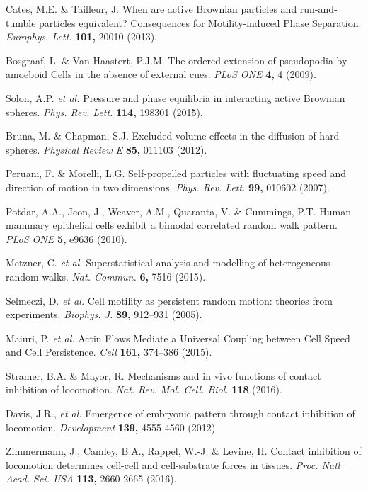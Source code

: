 \documentclass[11pt, twocolumn]{article}
\begin{document}
\begin{thebibliography}{10}
Cates, M.E. \& Tailleur, J. When are active Brownian particles and run-and-tumble particles equivalent? Consequences for Motility-induced Phase Separation. \emph{Europhys. Lett.} \textbf{101,} 20010 (2013).

Bosgraaf, L. \& Van Haastert, P.J.M. The ordered extension of pseudopodia by amoeboid Cells in the absence of external cues.
 {\em PLoS ONE} \textbf{4,} 4 (2009).

Solon, A.P. \textit{et al.} Pressure and phase equilibria in interacting active Brownian spheres.
 \emph{Phys. Rev. Lett.} \textbf{114,} 198301 (2015).

Bruna, M. \& Chapman, S.J. Excluded-volume effects in the diffusion of hard spheres.
 {\em Physical Review E} \textbf{85,} 011103 (2012).

Peruani, F. \& Morelli, L.G. Self-propelled particles with fluctuating speed and direction of motion in two dimensions.
 {\em Phys. Rev. Lett.} \textbf{99,} 010602 (2007).

 Potdar, A.A., Jeon, J., Weaver, A.M., Quaranta, V. \& Cummings, P.T. Human mammary epithelial cells exhibit a bimodal correlated random walk pattern.
 {\em PLoS ONE} \textbf{5,} e9636 (2010).

 Metzner, C. \textit{et al.} Superstatistical analysis and modelling of heterogeneous random walks.
 {\em Nat. Commun.} \textbf{6,} 7516 (2015).

 Selmeczi, D. \textit{et al.} Cell motility as persistent random motion: theories from experiments.
 {\em Biophys. J.} \textbf{89,} 912--931 (2005).

Maiuri, P. \textit{et al.} Actin Flows Mediate a Universal Coupling between Cell Speed and Cell Persistence.
 {\em Cell} \textbf{161,} 374--386 (2015).

Stramer, B.A. \& Mayor, R. Mechanisms and in vivo functions of contact inhibition of locomotion.
 {\em Nat. Rev. Mol. Cell. Biol.} \textbf{118} (2016). 

Davis, J.R., \textit{et al.} Emergence of embryonic pattern through contact inhibition
of locomotion.
 {\em Development} \textbf{139,} 4555-4560 (2012)

Zimmermann, J., Camley, B.A., Rappel, W.-J. \& Levine, H. Contact inhibition of locomotion determines cell-cell and cell-substrate forces in tissues.
 {\em Proc. Natl Acad. Sci. USA} \textbf{113,} 2660-2665 (2016).


\end{thebibliography}
\end{document}
